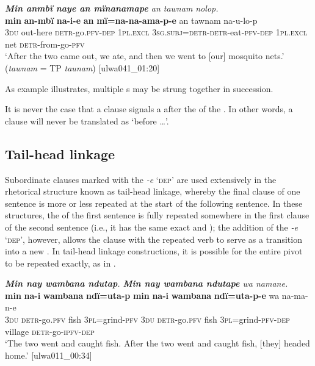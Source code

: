 \ea%
    \label{ex:complex:64}
         \textit{\textbf{Min anmbï naye an mïnanamape} an tawnam nolop.}\\
\gll    \textbf{min}  \textbf{an-mbï}    \textbf{na-i-e}        \textbf{an}     \textbf{mï=na-na-ama-p-e}           an      tawnam     na-u-lo-p\\
    3\textsc{du}  out-here  \textsc{detr-}go.\textsc{pfv-dep}  \textsc{1pl.excl}  \textsc{3sg.subj=detr-detr-}eat-\textsc{pfv-dep}  \textsc{1pl.excl}  net \textsc{detr-}from-go-\textsc{pfv}\\
\glt `After the two came out, we ate, and then we went to [our] mosquito nets.’ (\textit{tawnam} = TP \textit{taunam}) [ulwa041\_01:20]
\z

As example  illustrates, multiple s may be strung together in succession.

  It is never the case that a  clause signals a  after the  of the . In other words, a  clause will never be translated as ‘before …’.


\subsection{Tail-head linkage}\label{sec:12.2.5}


Subordinate clauses marked with the  \textit{-e} ‘\textsc{dep}’ are used extensively in the rhetorical structure known as tail-head linkage, whereby the final clause of one sentence is more or less repeated at the start of the following sentence. In these structures, the  of the first sentence is fully repeated somewhere in the first clause of the second sentence (i.e., it has the same exact  and  ); the addition of the  \textit{-e} ‘\textsc{dep}’, however, allows the clause with the repeated verb to serve as a transition into a new . In tail-head linkage constructions, it is possible for the entire pivot to be repeated exactly, as in .

\ea%
    \label{ex:complex:65}
          \textit{\textbf{Min nay wambana ndutap}. \textbf{Min nay wambana ndutape} wa namane.}\\
\gll    \textbf{min}  \textbf{na-i}      \textbf{wambana}  \textbf{ndï=uta-p}       \textbf{min} \textbf{na-i}      \textbf{wambana}  \textbf{ndï=uta-p-e}      wa     na-ma-n-e\\
    3\textsc{du}  \textsc{detr-}go.\textsc{pfv}  fish    3\textsc{pl}=grind-\textsc{pfv}  \textsc{3du}    \textsc{detr-}go\textsc{.pfv}  fish    3\textsc{pl}=grind-\textsc{pfv-dep}  village    \textsc{detr-}go-\textsc{ipfv-dep}\\
\glt `The two went and caught fish. After the two went and caught fish, [they] headed home.’ [ulwa011\_00:34]
\z

